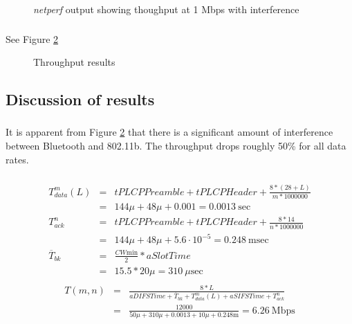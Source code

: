 \documentclass[11pt]{article}
\begin{document}
\begin{figure}[hp]
	\caption{\emph{netperf} output showing thoughput at 1 Mbps with interference}
	\label{1Mb_w_bluetooth}
\end{figure}

\subsubsection{}

See Figure \ref{graph}

\begin{figure}[hp]
	\caption{Throughput results}
	\label{graph}
\end{figure}

\subsection{Discussion of results}

\subsubsection{}

It is apparent from Figure \ref{graph} that there is a significant amount of interference between Bluetooth and 802.11b. The throughput drops roughly 50\% for all data rates.

\subsubsection{}

\begin{eqnarray*}
T^m_{data}(L) & = & tPLCPPreamble + tPLCPHeader + \frac{8*(28 + L)}{m * 1000000} \\
& = & 144\mu + 48\mu + 0.001 = 0.0013~\textrm{sec}\\
T^n_{ack} & = & tPLCPPreamble + tPLCPHeader + \frac{8*14}{n * 1000000} \\
& = & 144\mu + 48\mu + 5.6\cdot 10^{-5} = 0.248~\textrm{msec} \\
\overline{T}_{bk} & = & \frac{CW\textrm{min}}{2} * aSlotTime \\
& = & 15.5 * 20\mu = 310~\mu\textrm{sec} \\
\end{eqnarray*}
\begin{eqnarray*}
T(m,n) & = & \frac{8*L}{aDIFSTime + \overline{T}_{bk} + T^m_{data}(L) + aSIFSTime + T^n_{ack}} \\
& = & \frac{12000}{50\mu + 310\mu + 0.0013 + 10\mu + 0.248\textrm{m}} = 6.26~\textrm{Mbps}\\
\end{eqnarray*}
\end{document}
